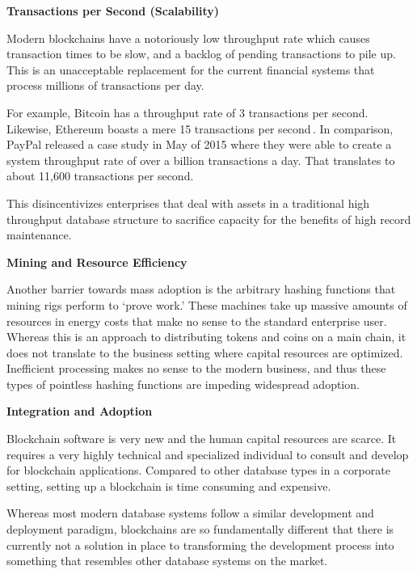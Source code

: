 \documentclass{%
	article}
\begin{document}
\begin{center}
\textbf{Transactions per Second (Scalability)}
\end{center}

Modern blockchains have a notoriously low throughput rate which causes transaction times to be slow, and a backlog of pending transactions to pile up. This is an unacceptable replacement for the current financial systems that process millions of transactions per day.

For example, Bitcoin has a throughput rate of 3 transactions per second. Likewise, Ethereum boasts a mere 15 transactions per second\,\cite{transactbandwidth}. In comparison, PayPal released a case study in May of 2015 where they were able to create a system throughput rate of over a billion transactions a day. That translates to about 11,600 transactions per second\cite{paypalcasestudy}.

This disincentivizes enterprises that deal with assets in a traditional high throughput database structure to sacrifice capacity for the benefits of high record maintenance.

\begin{center}
\textbf{Mining and Resource Efficiency}
\end{center}

Another barrier towards mass adoption is the arbitrary hashing functions that mining rigs perform to ‘prove work.’ These machines take up massive amounts of resources in energy costs that make no sense to the standard enterprise user. Whereas this is an approach to distributing tokens and coins on a main chain, it does not translate to the business setting where capital resources are optimized. Inefficient processing makes no sense to the modern business, and thus these types of pointless hashing functions are impeding widespread adoption.

\begin{center}
\textbf{Integration and Adoption}
\end{center}
Blockchain software is very new and the human capital resources are scarce. It requires a very highly technical and specialized individual to consult and develop for blockchain applications. Compared to other database types in a corporate setting, setting up a blockchain is time consuming and expensive. 

Whereas most modern database systems follow a similar development and deployment paradigm, blockchains are so fundamentally different that there is currently not a solution in place to transforming the development process into something that resembles other database systems on the market.
\end{document}
